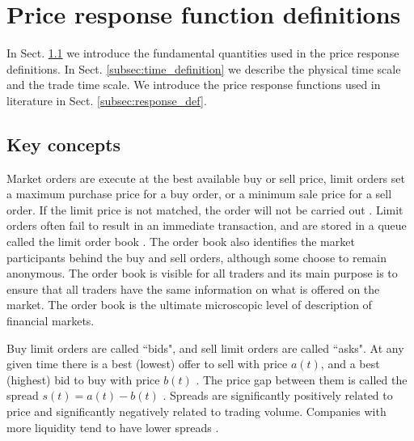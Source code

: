 \section{Price response function definitions}
\label{sec:response_functions_def}

In Sect. \ref{subsec:key_concepts} we introduce the fundamental quantities used
in the price response definitions. In Sect. \ref{subsec:time_definition} we
describe the physical time scale and the trade time scale. We introduce the
price response functions used in literature in Sect. \ref{subsec:response_def}.

\subsection{Key concepts}\label{subsec:key_concepts}

Market orders are execute at the best available buy or sell price, limit orders
set a maximum purchase price for a buy order, or a minimum sale price for a
sell order. If the limit price is not matched, the order will not be carried
out
\cite{large_prices_changes,predictive_pow,intro_market_micro,stat_theory}.
Limit orders often fail to result in an immediate transaction, and are stored
in a queue called the limit order book
\cite{prop_order_book,stat_prop,predictive_pow,intro_market_micro}. The order
book also identifies the market participants behind the buy and sell orders,
although some choose to remain anonymous. The order book is visible for all
traders and its main purpose is to ensure that all traders have the same
information on what is offered on the market. The order book is the ultimate
microscopic level of description of financial markets.

Buy limit orders are called ``bids", and sell limit orders are called ``asks".
At any given time there is a best (lowest) offer to sell with price
$a\left(t\right)$, and a best (highest) bid to buy with price $b\left(t\right)$
\cite{prop_order_book,subtle_nature,account_spread,limit_ord_spread,stat_theory}.
The price gap between them is called the spread
$s\left(t\right) = a\left(t\right)-b\left(t\right)$
\cite{subtle_nature,market_digest,Bouchaud_2004,account_spread,large_prices_changes,em_stylized_facts,stat_theory}.
Spreads are significantly positively related to price and significantly
negatively related to trading volume. Companies with more liquidity tend to
have lower spreads
\cite{components_spread_tokyo,effects_spread,account_spread,components_spread}.

